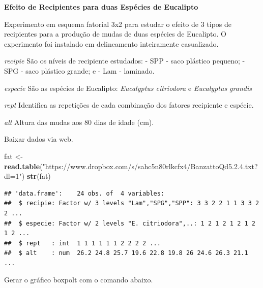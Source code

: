 \documentclass[
]{book}
\newenvironment{Shaded}{\begin{snugshade}}{\end{snugshade}}
\newcommand{\DataTypeTok}[1]{\textcolor[rgb]{0.13,0.29,0.53}{#1}}
\newcommand{\KeywordTok}[1]{\textcolor[rgb]{0.13,0.29,0.53}{\textbf{#1}}}
\newcommand{\NormalTok}[1]{#1}
\newcommand{\OperatorTok}[1]{\textcolor[rgb]{0.81,0.36,0.00}{\textbf{#1}}}
\newcommand{\StringTok}[1]{\textcolor[rgb]{0.31,0.60,0.02}{#1}}
\begin{document}
\textbf{Efeito de Recipientes para duas Espécies de Eucalipto}

Experimento em esquema fatorial 3x2 para estudar o efeito de 3 tipos de recipientes para a produção de mudas de duas espécies de Eucalipto. O experimento foi instalado em delineamento inteiramente casualizado.

\emph{recipie}
São os níveis de recipiente estudados:
- SPP - saco plástico pequeno;
- SPG - saco plástico grande; e
- Lam - laminado.

\emph{especie}
São as espécies de Eucalipto: \emph{Eucalyptus citriodora} e \emph{Eucalyptus grandis}

\emph{rept}
Identifica as repetições de cada combinação dos fatores recipiente e espécie.

\emph{alt}
Altura das mudas aos 80 dias de idade (cm).

Baixar dados via web.

\begin{Shaded}
\begin{Highlighting}[]
\NormalTok{fat <-}\StringTok{ }\KeywordTok{read.table}\NormalTok{(}\StringTok{"https://www.dropbox.com/s/sahc5n80rlkcfx4/BanzattoQd5.2.4.txt?dl=1"}\NormalTok{)}
\KeywordTok{str}\NormalTok{(fat)}
\end{Highlighting}
\end{Shaded}

\begin{verbatim}
## 'data.frame':    24 obs. of  4 variables:
##  $ recipie: Factor w/ 3 levels "Lam","SPG","SPP": 3 3 2 2 1 1 3 3 2 2 ...
##  $ especie: Factor w/ 2 levels "E. citriodora",..: 1 2 1 2 1 2 1 2 1 2 ...
##  $ rept   : int  1 1 1 1 1 1 2 2 2 2 ...
##  $ alt    : num  26.2 24.8 25.7 19.6 22.8 19.8 26 24.6 26.3 21.1 ...
\end{verbatim}

Gerar o gráfico boxpolt com o comando abaixo.

\begin{Shaded}
\end{Shaded}
\end{document}
